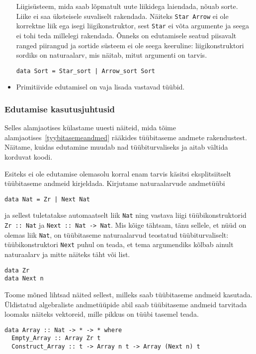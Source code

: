 \documentclass[12pt]{article}
\begin{document}
\begin{itemize}
            Liigisüsteem, mida saab lõpmatult uute liikidega laiendada, nõuab sorte. Liike ei saa üksteisele suvaliselt rakendada. Näiteks \verb!Star Arrow! ei ole korrektne liik ega isegi liigikonstruktor, sest \verb!Star! ei võta argumente ja seega ei tohi teda millelegi rakendada. Õnneks on edutamisele seatud piisavalt ranged piirangud ja sortide süsteem ei ole seega keeruline: liigikonstruktori sordiks on naturaalarv, mis näitab, mitut argumenti on tarvis.

            \begin{verbatim}data Sort = Star_sort | Arrow_sort Sort\end{verbatim}
          \item
            Primitiivide edutamisel on vaja lisada vastavad tüübid.
        \end{itemize}
      \subsubsection{Edutamise kasutusjuhtusid}
        Selles alamjaotises külastame uuesti näiteid, mida tõime alamjaotises~\ref{tyybitasemeandmed} rääkides tüübitaseme andmete rakendustest. Näitame, kuidas edutamine muudab nad tüübiturvaliseks ja aitab vältida korduvat koodi.

        Esiteks ei ole edutamise olemasolu korral enam tarvis käsitsi eksplitsiitselt tüübitaseme andmeid kirjeldada. Kirjutame naturaalarvude andmetüübi

        \begin{verbatim}data Nat = Zr | Next Nat\end{verbatim}

        ja sellest tuletatakse automaatselt liik \verb!Nat! ning vastava liigi tüübikonstruktorid \verb!Zr :: Nat! ja \verb!Next :: Nat -> Nat!. Mis kõige tähtsam, tänu sellele, et nüüd on olemas liik \verb!Nat!, on tüübitaseme naturaalarvud teostatud tüübiturvaliselt: tüübikonstruktori \verb!Next! puhul on teada, et tema argumendiks kõlbab ainult naturaalarv ja mitte näiteks täht või list.

      \begin{verbatim}data Zr
data Next n\end{verbatim}

      Toome mõned lihtsad näited sellest, milleks saab tüübitaseme andmeid kasutada. Üldistatud algebraliste andmetüüpide abil saab tüübitaseme andmeid tarvitada loomaks näiteks vektoreid, mille pikkus on tüübi tasemel teada.

      \begin{verbatim}data Array :: Nat -> * -> * where
  Empty_Array :: Array Zr t
  Construct_Array :: t -> Array n t -> Array (Next n) t\end{verbatim}
\end{document}
